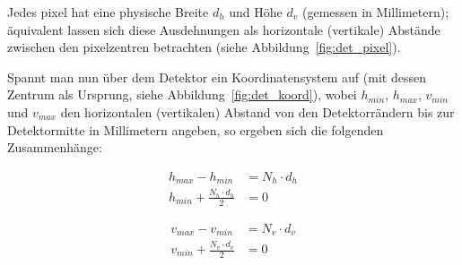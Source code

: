 Jedes \gls{pixel} hat eine physische Breite $d_h$ und Höhe $d_v$ (gemessen in Millimetern); äquivalent lassen sich diese
Ausdehnungen als horizontale (vertikale) Abstände zwischen den \gls{pixel}zentren betrachten (siehe
Abbildung~\ref{fig:det_pixel}).

Spannt man nun über dem Detektor ein Koordinatensystem auf (mit dessen Zentrum als Ursprung, siehe
Abbildung~\ref{fig:det_koord}), wobei $h_{min}$, $h_{max}$, $v_{min}$ und $v_{max}$ den horizontalen (vertikalen)
Abstand von den Detektorrändern bis zur Detektormitte in Millimetern angeben, so ergeben sich die folgenden
Zusammenhänge:

\begin{equation}\label{eq:det_h}
    \begin{aligned}
        h_{max} - h_{min} &= N_h \cdot d_h\\
        h_{min} + \frac{N_h \cdot d_h}{2} &= 0
    \end{aligned}
\end{equation}

\begin{equation}\label{eq:det_v}
    \begin{aligned}
        v_{max} - v_{min} &= N_v \cdot d_v\\
        v_{min} + \frac{N_v \cdot d_v}{2} &= 0
    \end{aligned}
\end{equation}

